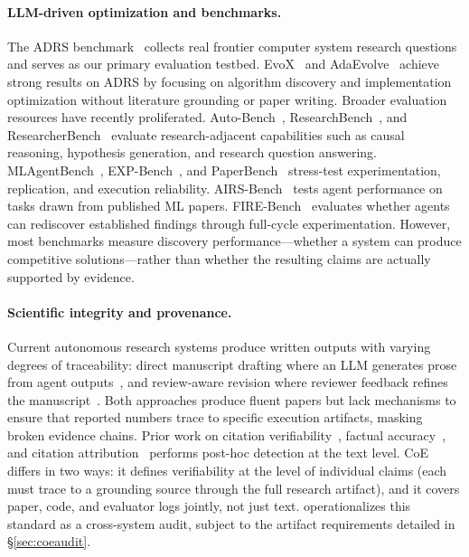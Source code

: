 \paragraph{LLM-driven optimization and benchmarks.}
The ADRS benchmark~\citep{cheng2025barbarians} collects real frontier computer system research questions and serves as our primary evaluation testbed.
EvoX~\citep{liu2026evox} and AdaEvolve~\citep{cemri2026adaevolve} achieve strong results on ADRS by focusing on algorithm discovery and implementation optimization without literature grounding or paper writing.
Broader evaluation resources have recently proliferated. Auto-Bench~\citep{zhong2025autobench}, ResearchBench~\citep{liu2025researchbench}, and ResearcherBench~\citep{xu2025researcherbench} evaluate research-adjacent capabilities such as causal reasoning, hypothesis generation, and research question answering. MLAgentBench~\citep{huang2024mlagentbench}, EXP-Bench~\citep{weng2025expbench}, and PaperBench~\citep{starace2025paperbench} stress-test experimentation, replication, and execution reliability. AIRS-Bench~\citep{jansen2025airsbench} tests agent performance on tasks drawn from published ML papers. FIRE-Bench~\citep{shojaee2025firebench} evaluates whether agents can rediscover established findings through full-cycle experimentation.
However, most benchmarks measure discovery performance---whether a system can produce competitive solutions---rather than whether the resulting claims are actually supported by evidence.


\paragraph{Scientific integrity and provenance.}
Current autonomous research systems produce written outputs with varying degrees of traceability: direct manuscript drafting where an LLM generates prose from agent outputs~\citep{lu2024aiscientist,jansen2025codescientist,tang2025airesearcher}, and review-aware revision where reviewer feedback refines the manuscript~\citep{yamada2025aiscientistv2}.
Both approaches produce fluent papers but lack mechanisms to ensure that reported numbers trace to specific execution artifacts, masking broken evidence chains.
Prior work on citation verifiability~\citep{liu2023evaluating}, factual accuracy~\citep{min2023factscore}, and citation attribution~\citep{press2024citeme} performs post-hoc detection at the text level.
CoE differs in two ways: it defines verifiability at the level of individual claims (each must trace to a grounding source through the full research artifact), and it covers paper, code, and evaluator logs jointly, not just text.
\coeaudit{} operationalizes this standard as a cross-system audit, subject to the artifact requirements detailed in \S\ref{sec:coeaudit}.
